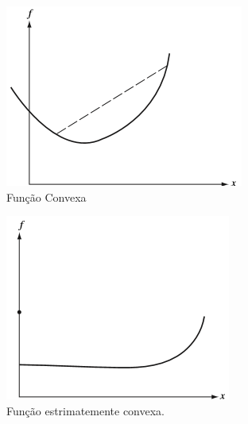 \documentclass[12pt,a4paper]{scrartcl}
\theoremstyle{definition}%
\begin{document}
\begin{figure}[!h] 
\centering
\begin{subfigure}[h]{0.45\textwidth}
\centering
\includegraphics[width=\textwidth]{convex_function1}
\caption{Função Convexa \label{fig:funcao_convexa}}
\end{subfigure}
\begin{subfigure}[!h]{0.43\textwidth}
	\centering
	\includegraphics[width=\textwidth]{convex_function2}
	\caption{Função estrimatemente convexa. \label{fig:funcao_estritamente_convexa}}
\end{subfigure}
\begin{subfigure}[!h]{0.4\textwidth}

\end{subfigure}
\end{figure}
\end{document}
